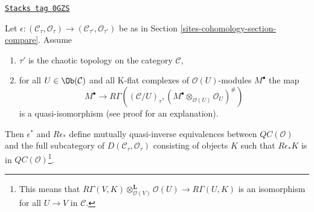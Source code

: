\begin{lemma}
\label{sites-cohomology-lemma-cartesion-plus-topology}
\href{https://stacks.math.columbia.edu/tag/0GZS}{\texttt{Stacks tag 0GZS}}

Let $\epsilon : (\mathcal{C}_\tau, \mathcal{O}_\tau) \to
(\mathcal{C}_{\tau'}, \mathcal{O}_{\tau'})$ be as in
Section \ref{sites-cohomology-section-compare}. Assume
\begin{enumerate}
\item $\tau'$ is the chaotic topology on the category $\mathcal{C}$,
\item for all $U \in \Ob(\mathcal{C})$ and all K-flat complexes of
$\mathcal{O}(U)$-modules $M^\bullet$ the map
$$
M^\bullet \longrightarrow
R\Gamma((\mathcal{C}/U)_\tau,
(M^\bullet \otimes_{\mathcal{O}(U)} \mathcal{O}_U)^\#)
$$
is a quasi-isomorphism (see proof for an explanation).
\end{enumerate}
Then $\epsilon^*$ and $R\epsilon_*$ define mutually quasi-inverse
equivalences between $\mathit{QC}(\mathcal{O})$ and
the full subcategory of $D(\mathcal{C}_\tau, \mathcal{O}_\tau)$
consisting of objects $K$ such that $R\epsilon_*K$ is in
$\mathit{QC}(\mathcal{O})$\footnote{This means that
$R\Gamma(V, K) \otimes_{\mathcal{O}(V)}^\mathbf{L} \mathcal{O}(U)
\to R\Gamma(U, K)$ is an isomorphism for all $U \to V$ in $\mathcal{C}$.}.
\end{lemma}

